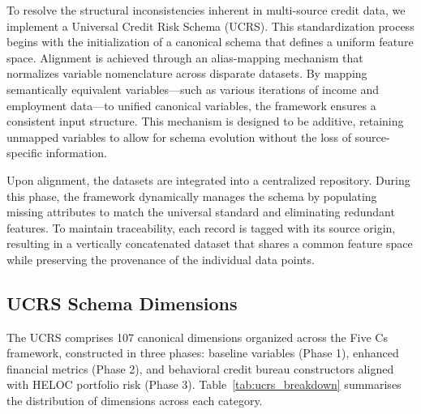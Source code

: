 \documentclass[onecolumn]{IEEEtai}
\begin{document}
To resolve the structural inconsistencies inherent in multi-source credit data, we implement a Universal Credit Risk Schema (UCRS). This standardization process begins with the initialization of a canonical schema that defines a uniform feature space. Alignment is achieved through an alias-mapping mechanism that normalizes variable nomenclature across disparate datasets. By mapping semantically equivalent variables—such as various iterations of income and employment data—to unified canonical variables, the framework ensures a consistent input structure. This mechanism is designed to be additive, retaining unmapped variables to allow for schema evolution without the loss of source-specific information.

Upon alignment, the datasets are integrated into a centralized repository. During this phase, the framework dynamically manages the schema by populating missing attributes to match the universal standard and eliminating redundant features. To maintain traceability, each record is tagged with its source origin, resulting in a vertically concatenated dataset that shares a common feature space while preserving the provenance of the individual data points.

\subsection{UCRS Schema Dimensions}
\label{app:ucrs_schema}\vspace{-4pt}

The UCRS comprises 107 canonical dimensions organized across the Five Cs framework, constructed in three phases: baseline variables (Phase 1), enhanced financial metrics (Phase 2), and behavioral credit bureau constructors aligned with HELOC portfolio risk (Phase 3). Table~\ref{tab:ucrs_breakdown} summarises the distribution of dimensions across each category.
\end{document}
